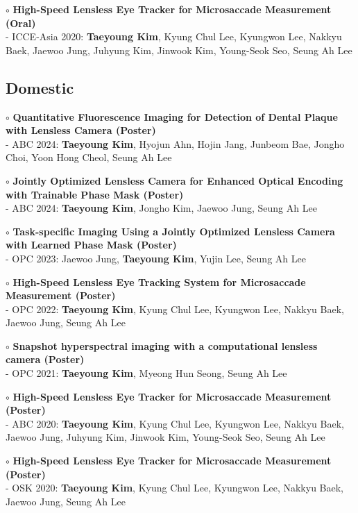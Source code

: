 \documentclass[a4paper,9pt]{extarticle}
\begin{document}
\begin{spacing}{1.05}
\noindent $\circ$  \textbf{High-Speed Lensless Eye Tracker for Microsaccade Measurement (Oral)} \\
- ICCE-Asia 2020: \textbf{Taeyoung Kim}, Kyung Chul Lee, Kyungwon Lee, Nakkyu Baek, Jaewoo Jung, Juhyung Kim, Jinwook Kim, Young-Seok Seo, Seung Ah Lee 


\subsection*{Domestic}

  \noindent $\circ$ \textbf{Quantitative Fluorescence Imaging for Detection of Dental Plaque with Lensless Camera (Poster)} \\
- ABC 2024: \textbf{Taeyoung Kim}, Hyojun Ahn, Hojin Jang, Junbeom Bae, Jongho Choi, Yoon Hong Cheol, Seung Ah Lee

 \noindent $\circ$ \textbf{Jointly Optimized Lensless Camera for Enhanced Optical Encoding with Trainable Phase Mask (Poster)} \\
- ABC 2024: \textbf{Taeyoung Kim}, Jongho Kim,  Jaewoo Jung, Seung Ah Lee

 \noindent $\circ$ \textbf{Task-specific Imaging Using a Jointly Optimized Lensless Camera with Learned Phase Mask (Poster)} \\
- OPC 2023: Jaewoo Jung, \textbf{Taeyoung Kim}, Yujin Lee, Seung Ah Lee 

 \noindent $\circ$ \textbf{High-Speed Lensless Eye Tracking System for Microsaccade Measurement (Poster)} \\
- OPC 2022: \textbf{Taeyoung Kim}, Kyung Chul Lee, Kyungwon Lee, Nakkyu Baek, Jaewoo Jung, Seung Ah Lee

\noindent $\circ$ \textbf{Snapshot hyperspectral imaging with a computational lensless camera (Poster)} \\
- OPC 2021: \textbf{Taeyoung Kim}, Myeong Hun Seong, Seung Ah Lee

\noindent $\circ$ \textbf{High-Speed Lensless Eye Tracker for Microsaccade Measurement (Poster)} \\
- ABC 2020: \textbf{Taeyoung Kim}, Kyung Chul Lee, Kyungwon Lee, Nakkyu Baek, Jaewoo Jung, Juhyung Kim, Jinwook Kim, Young-Seok Seo, Seung Ah Lee

\noindent $\circ$ \textbf{High-Speed Lensless Eye Tracker for Microsaccade Measurement (Poster)} \\
- OSK 2020: \textbf{Taeyoung Kim}, Kyung Chul Lee, Kyungwon Lee, Nakkyu Baek, Jaewoo Jung, Seung Ah Lee


\end{spacing}
\end{document}
